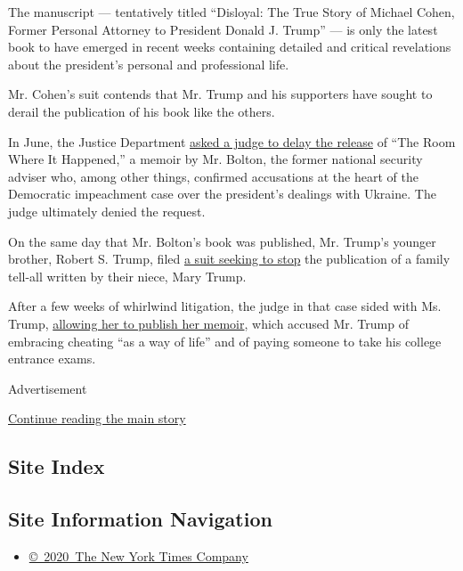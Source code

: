 The manuscript --- tentatively titled ``Disloyal: The True Story of
Michael Cohen, Former Personal Attorney to President Donald J. Trump''
--- is only the latest book to have emerged in recent weeks containing
detailed and critical revelations about the president's personal and
professional life.

Mr. Cohen's suit contends that Mr. Trump and his supporters have sought
to derail the publication of his book like the others.

In June, the Justice Department
\href{https://www.nytimes.com/2020/06/16/us/politics/john-bolton-book-publication.html}{asked
a judge to delay the release} of ``The Room Where It Happened,'' a
memoir by Mr. Bolton, the former national security adviser who, among
other things, confirmed accusations at the heart of the Democratic
impeachment case over the president's dealings with Ukraine. The judge
ultimately denied the request.

On the same day that Mr. Bolton's book was published, Mr. Trump's
younger brother, Robert S. Trump, filed
\href{https://www.nytimes.com/2020/06/23/us/politics/mary-trump-book-court.html}{a
suit seeking to stop} the publication of a family tell-all written by
their niece, Mary Trump.

After a few weeks of whirlwind litigation, the judge in that case sided
with Ms. Trump,
\href{https://www.nytimes.com/2020/07/07/us/politics/mary-trump-book.html}{allowing
her to publish her memoir}, which accused Mr. Trump of embracing
cheating ``as a way of life'' and of paying someone to take his college
entrance exams.

Advertisement

\protect\hyperlink{after-bottom}{Continue reading the main story}

\hypertarget{site-index}{%
\subsection{Site Index}\label{site-index}}

\hypertarget{site-information-navigation}{%
\subsection{Site Information
Navigation}\label{site-information-navigation}}

\begin{itemize}
\tightlist
\item
  \href{https://help.nytimes.com/hc/en-us/articles/115014792127-Copyright-notice}{©~2020~The
  New York Times Company}
\end{itemize}

